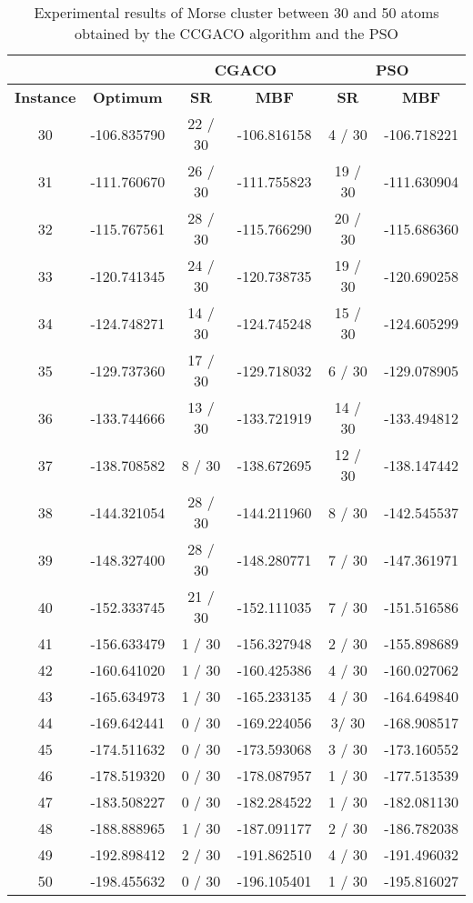 	\begin{table}[!htdp]
			\label{tab:cgaco_vs_pso}
			\begin{center}
				\begin{tabular}{| c | c | c | c | c | c |}
					\hline
					\multicolumn{2}{|c|}{} & \multicolumn{2}{c|}{\textbf{CGACO}} & \multicolumn{2}{c|}{\textbf{PSO}}\\ \hline
					\textbf{Instance} & \textbf{Optimum} & \textbf{SR} & \textbf{MBF} & \textbf{SR} & \textbf{MBF} \\ \hline
					30 & -106.835790 & 22 / 30 & -106.816158 & 4 / 30 & -106.718221 \\ \hline
					31 & -111.760670 & 26 / 30 & -111.755823 & 19 / 30 & -111.630904 \\ \hline
					32 & -115.767561 & 28 / 30 & -115.766290 & 20 / 30 & -115.686360 \\ \hline
					33 & -120.741345 & 24 / 30 & -120.738735 & 19 / 30 & -120.690258 \\ \hline
					34 & -124.748271 & 14 / 30 & -124.745248 & 15 / 30 & -124.605299 \\ \hline
					35 & -129.737360 & 17 / 30 & -129.718032 & 6 / 30 & -129.078905 \\ \hline
					36 & -133.744666 & 13 / 30 & -133.721919 & 14 / 30 & -133.494812 \\ \hline
					37 & -138.708582 & 8 / 30 & -138.672695 & 12 / 30 & -138.147442 \\ \hline
					38 & -144.321054 & 28 / 30 & -144.211960 & 8 / 30 & -142.545537 \\ \hline
					39 & -148.327400 & 28 / 30 & -148.280771 & 7 / 30 & -147.361971 \\ \hline
					40 & -152.333745 & 21 / 30 & -152.111035 & 7 / 30 & -151.516586 \\ \hline
					41 & -156.633479 & 1 / 30 & -156.327948 & 2 / 30 & -155.898689 \\ \hline
					42 & -160.641020 & 1 / 30 & -160.425386 & 4 / 30 & -160.027062 \\ \hline
					43 & -165.634973 & 1 / 30 & -165.233135 & 4 / 30 & -164.649840 \\ \hline
					44 & -169.642441 & 0 / 30 & -169.224056 & 3/ 30 & -168.908517 \\ \hline
					45 & -174.511632 & 0 / 30 & -173.593068 & 3 / 30 & -173.160552 \\ \hline
					46 & -178.519320 & 0 / 30 & -178.087957 & 1 / 30 & -177.513539 \\ \hline
					47 & -183.508227 & 0 / 30 & -182.284522 & 1 / 30 & -182.081130 \\ \hline
					48 & -188.888965 & 1 / 30 & -187.091177 & 2 / 30 & -186.782038 \\ \hline
					49 & -192.898412 & 2 / 30 & -191.862510 & 4 / 30 & -191.496032 \\ \hline
					50 & -198.455632 & 0 / 30 & -196.105401 & 1 / 30 & -195.816027 \\ \hline
				\end{tabular}
			\end{center}
			\caption{Experimental results of Morse cluster between 30 and 50 atoms obtained by the CCGACO algorithm and the PSO}
		\end{table}
		
